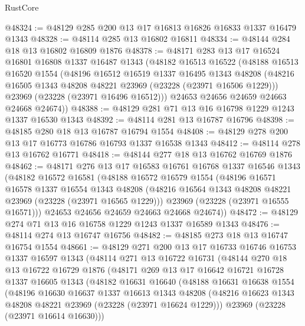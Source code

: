 \begin{lexlean}{RustCore}
\begin{coremodule}
@48324 := @48129 @285 @200 @13 @17 @16813 @16826 @16833 @1337 @16479 @1343
@48328 := @48114 @285 @13 @16802 @16811
@48334 := @48144 @284 @18 @13 @16802 @16809 @1876
@48378 := @48171
    @283
    @13
    @17
    @16524
    @16801
    @16808
    @1337
    @16487
    @1343
    (@48182
      @16513
      @16522
      (@48188
        @16513
        @16520
        @1554
        (@48196
          @16512
          @16519
          @1337
          @16495
          @1343
          @48208
          (@48216 @16505 @1343 @48208 @48221 @23969 (@23228 (@23971 @16506 @1229)))
          @23969
          (@23228 (@23971 @16496 @16512)))
        @24653
        @24656
        @24659
        @24663
        @24668
        @24674))
@48388 := @48129 @281 @71 @13 @16 @16798 @1229 @1243 @1337 @16530 @1343
@48392 := @48114 @281 @13 @16787 @16796
@48398 := @48185 @280 @18 @13 @16787 @16794 @1554
@48408 := @48129 @278 @200 @13 @17 @16773 @16786 @16793 @1337 @16538 @1343
@48412 := @48114 @278 @13 @16762 @16771
@48418 := @48144 @277 @18 @13 @16762 @16769 @1876
@48462 := @48171
    @276
    @13
    @17
    @16583
    @16761
    @16768
    @1337
    @16546
    @1343
    (@48182
      @16572
      @16581
      (@48188
        @16572
        @16579
        @1554
        (@48196
          @16571
          @16578
          @1337
          @16554
          @1343
          @48208
          (@48216 @16564 @1343 @48208 @48221 @23969 (@23228 (@23971 @16565 @1229)))
          @23969
          (@23228 (@23971 @16555 @16571)))
        @24653
        @24656
        @24659
        @24663
        @24668
        @24674))
@48472 := @48129 @274 @71 @13 @16 @16758 @1229 @1243 @1337 @16589 @1343
@48476 := @48114 @274 @13 @16747 @16756
@48482 := @48185 @273 @18 @13 @16747 @16754 @1554
@48661 := @48129
    @271
    @200
    @13
    @17
    @16733
    @16746
    @16753
    @1337
    @16597
    @1343
    (@48114
      @271
      @13
      @16722
      @16731
      (@48144
        @270
        @18
        @13
        @16722
        @16729
        @1876
        (@48171
          @269
          @13
          @17
          @16642
          @16721
          @16728
          @1337
          @16605
          @1343
          (@48182
            @16631
            @16640
            (@48188
              @16631
              @16638
              @1554
              (@48196
                @16630
                @16637
                @1337
                @16613
                @1343
                @48208
                (@48216 @16623 @1343 @48208 @48221 @23969 (@23228 (@23971 @16624 @1229)))
                @23969
                (@23228 (@23971 @16614 @16630)))

\end{coremodule}
\end{lexlean}
